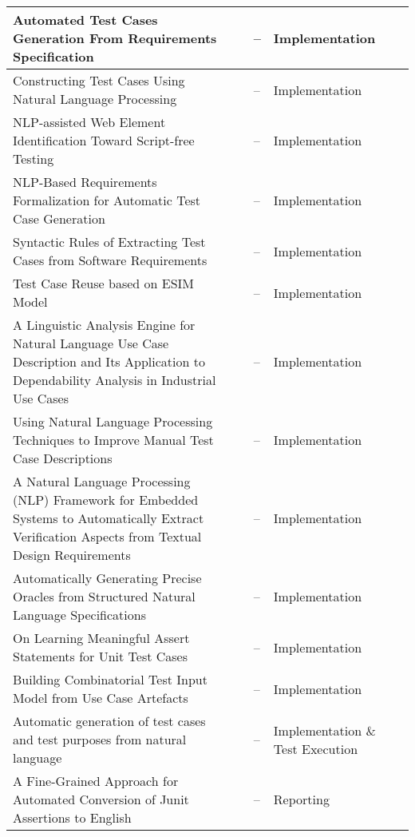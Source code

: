 \begin{appendices}
\begin{table}[H]
{\begin{tabular}{ |p{3cm}|p{3cm}|p{3cm}|p{3cm}|p{3cm}| }
            \hline Automated Test Cases Generation From Requirements Specification  & \cite{9491761} & --& Implementation\\
            \hline Constructing Test Cases Using Natural Language Processing  & \cite{7972390} & --& Implementation\\
            \hline NLP-assisted Web Element Identification Toward Script-free Testing & \cite{9609160} & --& Implementation\\
            \hline NLP-Based Requirements Formalization for Automatic Test Case Generation & \cite{inproceedings} & --& Implementation\\
            \hline Syntactic Rules of Extracting Test Cases from Software Requirements  & \cite{masuda2016syntactic} & --& Implementation\\
            \hline Test Case Reuse based on ESIM Model  & \cite{chen2021test} & --& Implementation\\
            \hline A Linguistic Analysis Engine for Natural Language Use Case Description and Its Application to Dependability Analysis in Industrial Use Cases
              & \cite{sinha2009linguistic} & --& Implementation\\
            \hline Using Natural Language Processing Techniques to Improve Manual Test Case Descriptions & \cite{viggiato2022using} & --& Implementation\\
            \hline A Natural Language Processing (NLP) Framework for Embedded Systems to Automatically Extract Verification Aspects from Textual Design Requirements
            & \cite{anwar2020natural} & --& Implementation\\
            \hline Automatically Generating Precise Oracles from Structured Natural Language Specifications & \cite{8812070} & --& Implementation\\
            \hline On Learning Meaningful Assert Statements for Unit Test Cases & \cite{9283916} & --& Implementation\\
            \hline Building Combinatorial Test Input Model from Use Case Artefacts & \cite{preeti2017building} & --& Implementation\\
            \hline Automatic generation of test cases and test purposes from natural language & \cite{nogueira2015automatic} & --& Implementation \& Test Execution\\
            \hline A Fine-Grained Approach for Automated Conversion of Junit Assertions to English  & \cite{10.1145/3283812.3283819} & --& Reporting\\

\end{tabular}}
\end{table}
\end{appendices}
